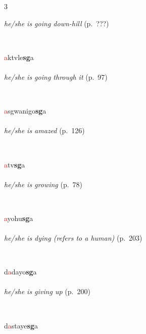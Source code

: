 \documentclass[oneside,openany]{book}%
\begin{document}
\begin{multicols}{3}
\begin{minipage}[t]{\linewidth}
\noindent \textit{he/she is going down-hill} (p.~???)
\end{minipage}\\[1em]%
\begin{minipage}[t]{\linewidth}
\raggedright\noindent \textcolor{Red}{a}ktvle\textbf{sg}a\\
\\
\noindent \textit{he/she is going through it} (p.~97)
\end{minipage}\\[1em]%
\begin{minipage}[t]{\linewidth}
\raggedright\noindent \textcolor{Red}{a}sgwanigo\textbf{sg}a\\
\\
\noindent \textit{he/she is amazed} (p.~126)
\end{minipage}\\[1em]%
\begin{minipage}[t]{\linewidth}
\raggedright\noindent \textcolor{Red}{a}tv\textbf{sg}a\\
\\
\noindent \textit{he/she is growing} (p.~78)
\end{minipage}\\[1em]%
\begin{minipage}[t]{\linewidth}
\raggedright\noindent \textcolor{Red}{a}yohu\textbf{sg}a\\
\\
\noindent \textit{he/she is dying (refers to a human)} (p.~203)
\end{minipage}\\[1em]%
\begin{minipage}[t]{\linewidth}
\raggedright\noindent d\textcolor{Red}{a}dayo\textbf{sg}a\\
\\
\noindent \textit{he/she is giving up} (p.~200)
\end{minipage}\\[1em]%
\begin{minipage}[t]{\linewidth}
\raggedright\noindent d\textcolor{Red}{a}staye\textbf{sg}a\\

\end{minipage}
\end{multicols}
\end{document}
